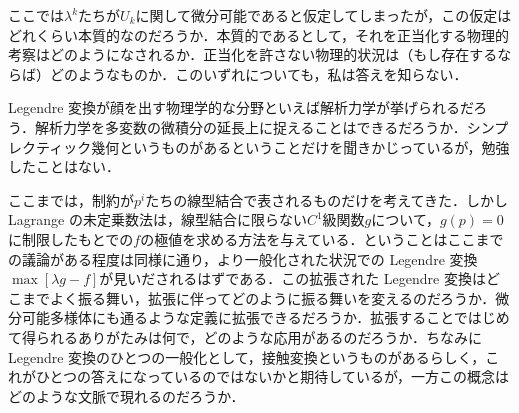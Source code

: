 \begin{que}[**]
ここでは$\lambda^k$たちが$U_k$に関して微分可能であると仮定してしまったが，この仮定はどれくらい本質的なのだろうか．本質的であるとして，それを正当化する物理的考察はどのようになされるか．正当化を許さない物理的状況は（もし存在するならば）どのようなものか．このいずれについても，私は答えを知らない．
\end{que}

\begin{que}[**]
Legendre 変換が顔を出す物理学的な分野といえば解析力学が挙げられるだろう．解析力学を多変数の微積分の延長上に捉えることはできるだろうか．シンプレクティック幾何というものがあるということだけを聞きかじっているが，勉強したことはない．
\end{que}

\begin{que}[**]
ここまでは，制約が$p^i$たちの線型結合で表されるものだけを考えてきた．しかし Lagrange の未定乗数法は，線型結合に限らない$C^1$級関数$g$について，$g(p)=0$に制限したもとでの$f$の極値を求める方法を与えている．ということはここまでの議論がある程度は同様に通り，より一般化された状況での Legendre 変換$\max \left[ \lambda g - f \right]$が見いだされるはずである．この拡張された Legendre 変換はどこまでよく振る舞い，拡張に伴ってどのように振る舞いを変えるのだろうか．微分可能多様体にも通るような定義に拡張できるだろうか．拡張することではじめて得られるありがたみは何で，どのような応用があるのだろうか．ちなみに Legendre 変換のひとつの一般化として，接触変換というものがあるらしく，これがひとつの答えになっているのではないかと期待しているが，一方この概念はどのような文脈で現れるのだろうか．
\end{que}

